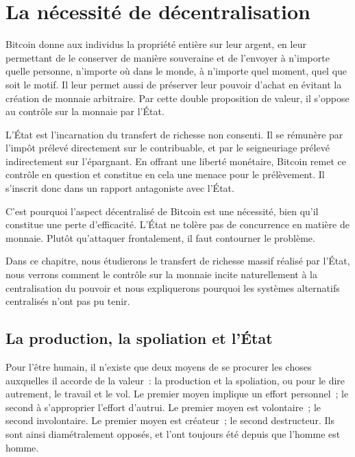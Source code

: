 
\chapter{La nécessité de décentralisation}
\label{ch:adversaire}

Bitcoin donne aux individus la propriété entière sur leur argent, en leur permettant de le conserver de manière souveraine et de l'envoyer à n'importe quelle personne, n'importe où dans le monde, à n'importe quel moment, quel que soit le motif. Il leur permet aussi de préserver leur pouvoir d'achat en évitant la création de monnaie arbitraire. Par cette double proposition de valeur, il s'oppose au contrôle sur la monnaie par l'État.

L'État est l'incarnation du transfert de richesse non consenti. Il se rémunère par l'impôt prélevé directement sur le contribuable, et par le seigneuriage prélevé indirectement sur l'épargnant. En offrant une liberté monétaire, Bitcoin remet ce contrôle en question et constitue en cela une menace pour le prélèvement. Il s'inscrit donc dans un rapport antagoniste avec l'État.

C'est pourquoi l'aspect décentralisé de Bitcoin est une nécessité, bien qu'il constitue une perte d'efficacité. L'État ne tolère pas de concurrence en matière de monnaie. Plutôt qu'attaquer frontalement, il faut contourner le problème.

Dans ce chapitre, nous étudierons le transfert de richesse massif réalisé par l'État, nous verrons comment le contrôle sur la monnaie incite naturellement à la centralisation du pouvoir et nous expliquerons pourquoi les systèmes alternatifs centralisés n'ont pas pu tenir.

\section*{La production, la spoliation et l'État}

Pour l'être humain, il n'existe que deux moyens de se procurer les choses auxquelles il accorde de la valeur~: la production et la spoliation, ou pour le dire autrement, le travail et le vol. Le premier moyen implique un effort personnel~; le second à s'approprier l'effort d'autrui. Le premier moyen est volontaire~; le second involontaire. Le premier moyen est créateur~; le second destructeur. Ils sont ainsi diamétralement opposés, et l'ont toujours été depuis que l'homme est homme.


